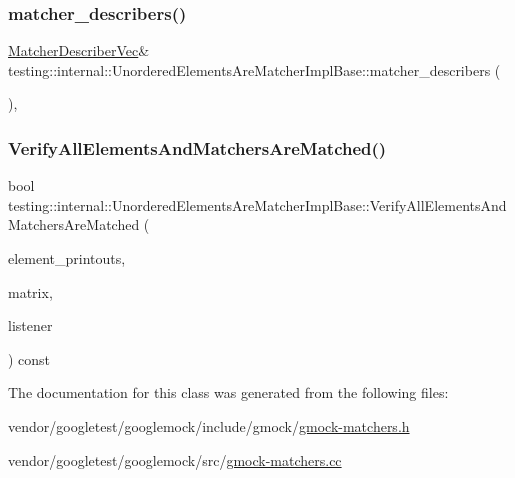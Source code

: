 \subsubsection{\texorpdfstring{matcher\+\_\+describers()}{matcher\_describers()}}
{\footnotesize\ttfamily \hyperlink{classtesting_1_1internal_1_1_unordered_elements_are_matcher_impl_base_a81ca7ce793d4b25ce2a7d3e28b48cd64}{Matcher\+Describer\+Vec}\& testing\+::internal\+::\+Unordered\+Elements\+Are\+Matcher\+Impl\+Base\+::matcher\+\_\+describers (\begin{DoxyParamCaption}{ }\end{DoxyParamCaption})\hspace{0.3cm}{\ttfamily [inline]}, {\ttfamily [protected]}}

\mbox{\label{classtesting_1_1internal_1_1_unordered_elements_are_matcher_impl_base_a515ec900bd84fe4d28e3ccf55db25822}} 
\subsubsection{\texorpdfstring{Verify\+All\+Elements\+And\+Matchers\+Are\+Matched()}{VerifyAllElementsAndMatchersAreMatched()}}
{\footnotesize\ttfamily bool testing\+::internal\+::\+Unordered\+Elements\+Are\+Matcher\+Impl\+Base\+::\+Verify\+All\+Elements\+And\+Matchers\+Are\+Matched (\begin{DoxyParamCaption}\item[{const \+::std\+::vector$<$ \hyperlink{namespacetesting_1_1internal_a8e8ff5b11e64078831112677156cb111}{string} $>$ \&}]{element\+\_\+printouts,  }\item[{const \hyperlink{classtesting_1_1internal_1_1_match_matrix}{Match\+Matrix} \&}]{matrix,  }\item[{\hyperlink{classtesting_1_1_match_result_listener}{Match\+Result\+Listener} $\ast$}]{listener }\end{DoxyParamCaption}) const\hspace{0.3cm}{\ttfamily [protected]}}



The documentation for this class was generated from the following files\+:\begin{DoxyCompactItemize}
\item 
vendor/googletest/googlemock/include/gmock/\hyperlink{gmock-matchers_8h}{gmock-\/matchers.\+h}\item 
vendor/googletest/googlemock/src/\hyperlink{gmock-matchers_8cc}{gmock-\/matchers.\+cc}\end{DoxyCompactItemize}
